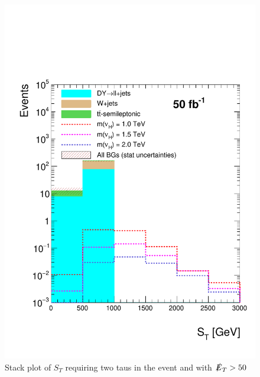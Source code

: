 \begin{figure}[H]
\centering
\includegraphics[width=\linewidth]{StackPlots/ST_2taus_met50_50ifb.pdf}
\caption{Stack plot of $S_{T}$ requiring two taus in the event and with $\slashed{E}_{T} > 50$}
\label{fig: ST2tausMet50}
\end{figure}


